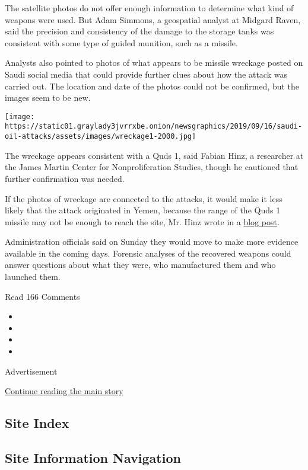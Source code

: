 The satellite photos do not offer enough information to determine what
kind of weapons were used. But Adam Simmons, a geospatial analyst at
Midgard Raven, said the precision and consistency of the damage to the
storage tanks was consistent with some type of guided munition, such as
a missile.

Analysts also pointed to photos of what appears to be missile wreckage
posted on Saudi social media that could provide further clues about how
the attack was carried out. The location and date of the photos could
not be confirmed, but the images seem to be new.

\texttt{[image: https://static01.graylady3jvrrxbe.onion/newsgraphics/2019/09/16/saudi-oil-attacks/assets/images/wreckage1-2000.jpg]}

The wreckage appears consistent with a Quds 1, said Fabian Hinz, a
researcher at the James Martin Center for Nonproliferation Studies,
though he cautioned that further confirmation was needed.

If the photos of wreckage are connected to the attacks, it would make it
less likely that the attack originated in Yemen, because the range of
the Quds 1 missile may not be enough to reach the site, Mr. Hinz wrote
in a
\href{https://www.armscontrolwonk.com/archive/1208062/meet-the-quds-1/}{blog
post}.

Administration officials said on Sunday they would move to make more
evidence available in the coming days. Forensic analyses of the
recovered weapons could answer questions about what they were, who
manufactured them and who launched them.

Read 166 Comments

\begin{itemize}
\item
\item
\item
\item
\end{itemize}

Advertisement

\protect\hyperlink{after-bottom}{Continue reading the main story}

\hypertarget{site-index}{%
\subsection{Site Index}\label{site-index}}

\hypertarget{site-information-navigation}{%
\subsection{Site Information
Navigation}\label{site-information-navigation}}

